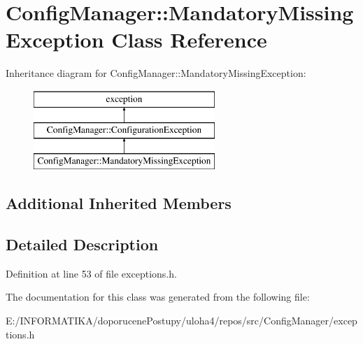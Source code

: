 \hypertarget{class_config_manager_1_1_mandatory_missing_exception}{}\section{Config\+Manager\+:\+:Mandatory\+Missing\+Exception Class Reference}
\label{class_config_manager_1_1_mandatory_missing_exception}
Inheritance diagram for Config\+Manager\+:\+:Mandatory\+Missing\+Exception\+:\begin{figure}[H]
\begin{center}
\leavevmode
\includegraphics[height=3.000000cm]{class_config_manager_1_1_mandatory_missing_exception}
\end{center}
\end{figure}
\subsection*{Additional Inherited Members}


\subsection{Detailed Description}


Definition at line 53 of file exceptions.\+h.



The documentation for this class was generated from the following file\+:\begin{DoxyCompactItemize}
\item 
E\+:/\+I\+N\+F\+O\+R\+M\+A\+T\+I\+K\+A/doporucene\+Postupy/uloha4/repos/src/\+Config\+Manager/exceptions.\+h\end{DoxyCompactItemize}
